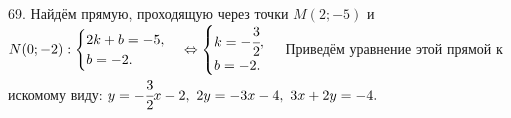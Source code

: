 69. Найдём прямую, проходящую через точки $M(2;-5)$ и $N(0;-2): \begin{cases} 2k+b=-5,\\ b=-2.\end{cases}\Leftrightarrow\begin{cases} k=-\cfrac{3}{2},\\ b=-2.\end{cases}$ Приведём уравнение этой прямой к искомому виду: $y=-\cfrac{3}{2}x-2,\ 2y=-3x-4,\ 3x+2y=-4.$\\

